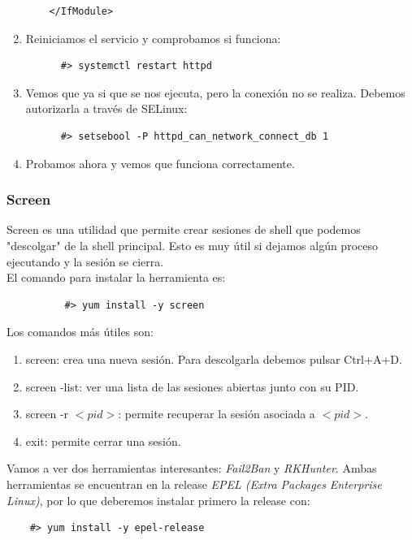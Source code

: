 \documentclass[12pt,spanish]{article}
\begin{document}
\begin{enumerate}
\begin{lstlisting}
    </IfModule>
    \end{lstlisting}
    \item Reiniciamos el servicio y comprobamos si funciona:
    \begin{lstlisting}
      #> systemctl restart httpd
    \end{lstlisting}
    \item Vemos que ya si que se nos ejecuta, pero la conexión no se realiza. Debemos autorizarla a través de SELinux:
    \begin{lstlisting}
      #> setsebool -P httpd_can_network_connect_db 1
    \end{lstlisting}
    \item Probamos ahora y vemos que funciona correctamente.
\end{enumerate}

\subsubsection{Screen}

Screen es una utilidad que permite crear sesiones de shell que podemos "descolgar" de la shell principal. Esto es muy útil si dejamos algún proceso ejecutando y la sesión se cierra.\\
El comando para instalar la herramienta es:

\begin{lstlisting}
          #> yum install -y screen
\end{lstlisting}

Los comandos más útiles son:
\begin{enumerate}
  \item screen: crea una nueva sesión. Para descolgarla debemos pulsar Ctrl+A+D.
  \item screen -list: ver una lista de las sesiones abiertas junto con su PID.
  \item screen -r $<pid>$: permite recuperar la sesión asociada a $<pid>$.
  \item exit: permite cerrar una sesión.
\end{enumerate}

  Vamos a ver dos herramientas interesantes: \textit{Fail2Ban} y \textit{RKHunter}. Ambas herramientas se encuentran en la release \textit{EPEL (Extra Packages Enterprise Linux)}, por lo que deberemos instalar primero la release con:
  \begin{lstlisting}
    #> yum install -y epel-release
  \end{lstlisting}
\end{document}
